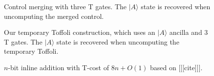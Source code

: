\documentclass[twocolumn,longbibliography]{quantumarticle-customized}
\begin{document}
\begin{figure}
  \caption{
	Control merging with three T gates.
	The $|A\rangle$ state is recovered when uncomputing the merged control.
  }
  \label{fig:ancilla-temporary-toffoli}
\end{figure}

\begin{figure}
  \caption{
	Our temporary Toffoli construction, which uses an $|A\rangle$ ancilla and 3 T gates.
	The $|A\rangle$ state is recovered when uncomputing the temporary Toffoli.
  }
  \label{fig:ancilla-temporary-toffoli}
\end{figure}

\begin{figure}
  \centering
  \makebox[\linewidth]{
  }
  \caption{
	$n$-bit inline addition with T-cost of $8n + O(1)$ based on [[[cite]]].
  }
  \label{fig:inline-addition}
\end{figure}
\end{document}
